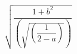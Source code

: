 \documentclass[varwidth,border=8pt]{standalone}
\begin{document}
\[
\displaystyle \sqrt{\displaystyle \dfrac{\displaystyle 1 + b^{2}}{\displaystyle \left(\sqrt{\displaystyle \left(\dfrac{\displaystyle 1}{\displaystyle 2 - a}\right)}\right)}}
\]
\end{document}
